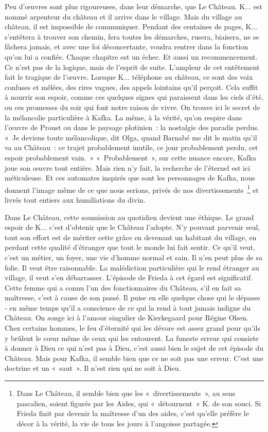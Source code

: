 \documentclass{book}
\begin{document}
Peu d'œuvres sont plus rigoureuses, dans leur démarche, que Le Château. K... est nommé arpenteur du château et il arrive dans le village. Mais du village au château, il est impossible de communiquer. Pendant des centaines de pages, K... s'entêtera à trouver son chemin, fera toutes les démarches, rusera, biaisera, ne se fâchera jamais, et avec une foi déconcertante, voudra rentrer dans la fonction qu'on lui a confiée. Chaque chapitre est un échec. Et aussi un recommencement. Ce n'est pas de la logique, mais de l'esprit de suite. L'ampleur de cet entêtement fait le tragique de l'œuvre. Lorsque K... téléphone au château, ce sont des voix confuses et mêlées, des rires vagues, des appels lointains qu'il perçoit. Cela suffit à nourrir son espoir, comme ces quelques signes qui paraissent dans les ciels d'été, ou ces promesses du soir qui font notre raison de vivre. On trouve ici le secret de la mélancolie particulière à Kafka. La même, à la vérité, qu'on respire dans l'œuvre de Proust ou dans le paysage plotinien : la nostalgie des paradis perdus. « Je deviens toute mélancolique, dit Olga, quand Barnabé me dit le matin qu'il va au Château : ce trajet probablement inutile, ce jour probablement perdu, cet espoir probablement vain. » « Probablement », sur cette nuance encore, Kafka joue son œuvre tout entière. Mais rien n'y fait, la recherche de l'éternel est ici méticuleuse. Et ces automates inspirés que sont les personnages de Kafka, nous donnent l'image même de ce que nous serions, privés de nos divertissements \footnote{Dans Le Château, il semble bien que les « divertissements », au sens pascalien, soient figurés par les Aides, qui « détournent » K. de son souci. Si Frieda finit par devenir la maîtresse d'un des aides, c'est qu'elle préfère le décor à la vérité, la vie de tous les jours à l'angoisse partagée.} et livrés tout entiers aux humiliations du divin.

Dans Le Château, cette soumission au quotidien devient une éthique. Le grand espoir de K... c'est d'obtenir que le Château l'adopte. N'y pouvant parvenir seul, tout son effort est de mériter cette grâce en devenant un habitant du village, en perdant cette qualité d'étranger que tout le monde lui fait sentir. Ce qu'il veut, c'est un métier, un foyer, une vie d'homme normal et sain. Il n'en peut plus de sa folie. Il veut être raisonnable. La malédiction particulière qui le rend étranger au village, il veut s'en débarrasser. L'épisode de Frieda à cet égard est significatif. Cette femme qui a connu l'un des fonctionnaires du Château, s'il en fait sa maîtresse, c'est à cause de son passé. Il puise en elle quelque chose qui le dépasse ‑ en même temps qu'il a conscience de ce qui la rend à tout jamais indigne du Château. On songe ici à l'amour singulier de Kierkegaard pour Régine Olsen. Chez certains hommes, le feu d'éternité qui les dévore est assez grand pour qu'ils y brûlent le cœur même de ceux qui les entourent. La funeste erreur qui consiste à donner à Dieu ce qui n'est pas à Dieu, c'est aussi bien le sujet de cet épisode du Château. Mais pour Kafka, il semble bien que ce ne soit pas une erreur. C'est une doctrine et un « saut ». Il n'est rien qui ne soit à Dieu.
\end{document}
